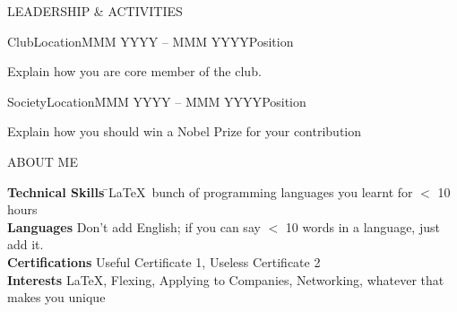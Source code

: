 \documentclass{article}
\newlength{\secsep}
\newcommand{\lineunder}{\vspace*{-8pt} \\ \hspace*{-6pt} \hrulefill \\ \vspace*{-15pt}}
\newenvironment{tabbedsection}[1]{
  \begin{list}{}{
      \setlength{\itemsep}{0pt}
      \setlength{\labelsep}{0pt}
      \setlength{\labelwidth}{0pt}
      \setlength{\leftmargin}{0pt}
      \setlength{\rightmargin}{0pt}
      \setlength{\listparindent}{0pt}
      \setlength{\parsep}{0pt}
      \setlength{\parskip}{0pt}
      \setlength{\partopsep}{0pt}
      \setlength{\topsep}{0.4pt}
    }
  \item[]
}{\end{list}}
\newenvironment{resume_section}[1]{
  \filbreak
  \vspace{2\secsep}
  \textbf{\textsc{\large#1}}
  \lineunder
  \begin{tabbedsection}{\secsep}
}{\end{tabbedsection}}
\newenvironment{subitems}{
  
  \begin{itemize}
      \setlength{\labelsep}{1em}
}{\end{itemize}}
\newenvironment{resume_employer}[4]{
  \vspace{\secsep}
  \textbf{#1}  \hfill \textbf{#2}
  \begin{flushright} \indent \emph{{\small#4}} \hfill \emph{{\small#3}} \end{flushright}
  \begin{tabbedsection}{0pt}
  \begin{subitems}
}{\end{subitems}\end{tabbedsection}}
\begin{document}
 \begin{resume_section}{LEADERSHIP \& ACTIVITIES}
    \begin{resume_employer}{Club}{Location}{MMM YYYY -- MMM YYYY}{Position}
    \item \small{Explain how you are core member of the club.}
\end{resume_employer}
 
       \begin{resume_employer}{Society}{Location}{MMM YYYY -- MMM YYYY}{Position}
    \item \small{Explain how you should win a Nobel Prize for your contribution}
\end{resume_employer}

   \end{resume_section}
  
 \begin{resume_section}{ABOUT ME}
  \begin{tabbing}
  \textbf{Technical Skills} \= \quad\small{\LaTeX\, bunch of programming languages you learnt for $<$ 10 hours} \\
  \textbf{Languages} \> \quad\small{Don't add English; if you can say $<$ 10 words in a language, just add it.}\\
  \textbf{Certifications} \> \quad\small{Useful Certificate 1, Useless Certificate 2}\\
  \textbf{Interests} \> \quad\small{\LaTeX, Flexing, Applying to Companies, Networking, whatever that makes you unique}\\
  \end{tabbing}

\end{resume_section}
\end{document}
